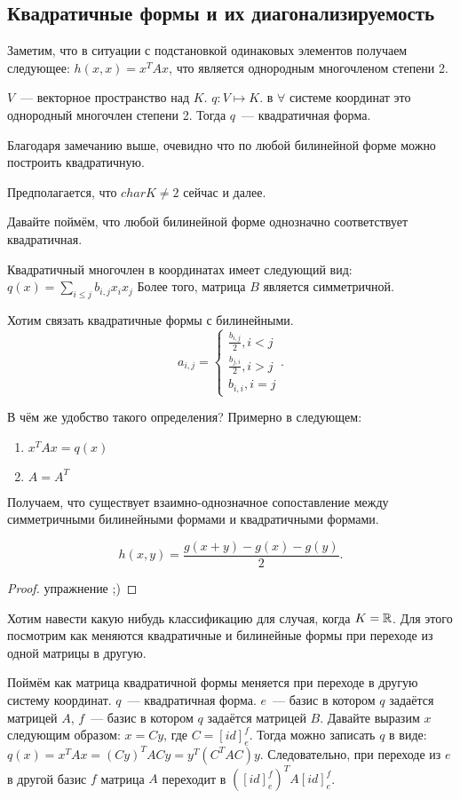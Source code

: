 \subsection{Квадратичные формы и их диагонализируемость}
\begin{remark}
    Заметим, что в ситуации с подстановкой одинаковых элементов получаем следующее:
    $h(x,x) = x^TAx$, что является однородным многочленом степени 2.
\end{remark}
\begin{definition}
    $V$~--- векторное пространство над $K$. $q\colon V\mapsto K$. 
    в $\forall$ системе координат это однородный многочлен степени 2.
    Тогда $q$~--- квадратичная форма.
\end{definition}
Благодаря замечанию выше, очевидно что по любой билинейной форме можно построить
квадратичную.
\begin{remark}
    Предполагается, что $char K \not= 2$ сейчас и далее.
\end{remark}
Давайте поймём, что любой билинейной форме однозначно соответствует квадратичная.
\begin{remark}
    Квадратичный многочлен в координатах имеет следующий вид:
    $q(x) = \sum\limits_{i\le j}^{}{b_{i,j} x_i x_j}$
    Более того, матрица $B$ является симметричной.
\end{remark}
Хотим связать квадратичные формы с билинейными.
 \[
 a_{i,j} = 
 \begin{cases}
     \frac{b_{i,j}}{2}, i < j\\
     \frac{b_{j,i}}{2}, i > j\\
     b_{i,i}, i = j
 \end{cases}
.\] 

В чём же удобство такого определения? Примерно в следующем:
\begin{enumerate}
    \item
        $x^TAx = q(x)$
    \item
         $A = A^T$
\end{enumerate}
Получаем, что существует взаимно-однозначное сопоставление между
симметричными билинейными формами и квадратичными формами.

\begin{statement}
     \[
    h(x, y) = \frac{g(x + y) - g(x) - g(y)}{2}
    .\] 
\end{statement}
\begin{proof}
    упражнение ;)
\end{proof}
\begin{motivation}
    Хотим навести какую нибудь классификацию для случая, когда $K = \mathbb{R}$.
    Для этого посмотрим как меняются квадратичные и билинейные формы при переходе из одной матрицы в другую.
\end{motivation}
Поймём как матрица квадратичной формы меняется при переходе в другую систему координат.
$q$~--- квадратичная форма. $e$~--- базис в котором $q$ задаётся матрицей $A$,
$f$~--- базис в котором $q$ задаётся матрицей $B$.
Давайте выразим $x$ следующим образом: $x = Cy$, где $C = [id]^f_e$.
Тогда можно записать $q$ в виде: $q(x) = x^T A x = (Cy)^T AC y = y^T (C^TAC) y$.
Следовательно, при переходе из $e$ в другой базис $f$ матрица $A$ переходит в $([id]^f_e)^T A [id]^f_e$.

